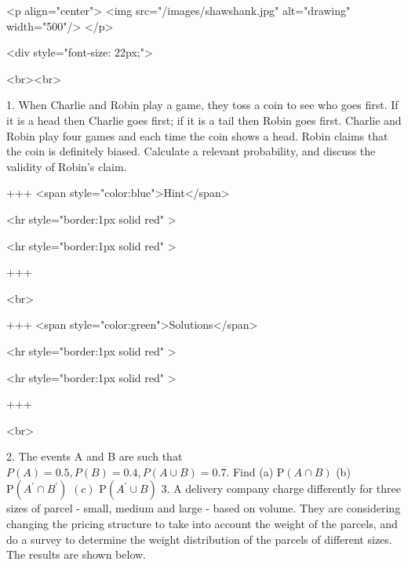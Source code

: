 <p align="center">
<img src="/images/shawshank.jpg" alt="drawing" width="500"/>
</p>

<div style="font-size: 22px;">

<br><br>

1. When Charlie and Robin play a game, they toss a coin to see who goes first. If it is a head then Charlie goes first; if it is a tail then Robin goes first. Charlie and Robin play four games and each time the coin shows a head. Robin claims that the coin is definitely biased. Calculate a relevant probability, and discuss the validity of Robin's claim.

+++ <span style="color:blue">Hint</span>

<hr style="border:1px solid red" >

<hr style="border:1px solid red" >

+++

<br>

+++ <span style="color:green">Solutions</span>

<hr style="border:1px solid red" >

<hr style="border:1px solid red" >

+++

<br>

2. The events A and B are such that $P(A)=0.5, P(B)=0.4, P(A \cup B)=0.7$. Find
(a) $\mathrm{P}(A \cap B)$
(b) $\mathrm{P}\left(A^{\prime} \cap B^{\prime}\right)$
\((c)\) $\mathrm{P}\left(A^{\prime} \cup B\right)$
3. A delivery company charge differently for three sizes of parcel - small, medium and large - based on volume. They are considering changing the pricing structure to take into account the weight of the parcels, and do a survey to determine the weight distribution of the parcels of different sizes. The results are shown below.

